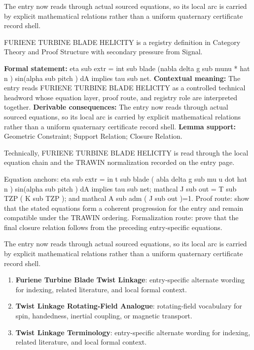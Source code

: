 The entry now reads through actual sourced equations, so its local arc is carried by explicit mathematical relations rather than a uniform quaternary certificate record shell.
\clearpage


\begingroup\small
{}
FURIENE TURBINE BLADE HELICITY is a registry definition in Category Theory and Proof Structure with secondary pressure from Signal.

\begingroup\footnotesize\setlength{\emergencystretch}{3em}\sloppy
\textbf{Formal statement:} eta sub extr = int sub blade (nabla delta g sub munu * hat n ) sin(alpha sub pitch ) dA implies tau sub net. \textbf{Contextual meaning:} The entry reads FURIENE TURBINE BLADE HELICITY as a controlled technical headword whose equation layer, proof route, and registry role are interpreted together. \textbf{Derivable consequences:} The entry now reads through actual sourced equations, so its local arc is carried by explicit mathematical relations rather than a uniform quaternary certificate record shell. \textbf{Lemma support:} Geometric Constraint; Support Relation; Closure Relation.\par
\endgroup

Technically, FURIENE TURBINE BLADE HELICITY is read through the local equation chain and the TRAWIN normalization recorded on the entry page.

Equation anchors: eta sub extr = in t sub blade ( abla delta g sub mu u dot hat n ) sin(alpha sub pitch ) dA implies tau sub net; mathcal J sub out = T sub TZP ( K sub TZP ); and mathcal A sub adm ( J sub out )=1. Proof route: show that the stated equations form a coherent progression for the entry and remain compatible under the TRAWIN ordering. Formalization route: prove that the final closure relation follows from the preceding entry-specific equations.

The entry now reads through actual sourced equations, so its local arc is carried by explicit mathematical relations rather than a uniform quaternary certificate record shell.
\endgroup

\begin{enumerate}[leftmargin=1.6em,itemsep=6pt,topsep=4pt]
\item \textbf{Furiene Turbine Blade Twist Linkage}: entry-specific alternate wording for indexing, related literature, and local formal context.
\item \textbf{Twist Linkage Rotating-Field Analogue}: rotating-field vocabulary for spin, handedness, inertial coupling, or magnetic transport.
\item \textbf{Twist Linkage Terminology}: entry-specific alternate wording for indexing, related literature, and local formal context.
\end{enumerate}

